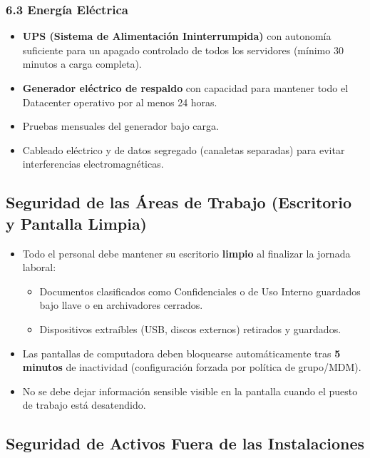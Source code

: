 \documentclass[10pt,letterpaper]{article}
\begin{document}
\subsubsection{6.3 Energía Eléctrica}\label{energuxeda-eluxe9ctrica}

\begin{itemize}
\tightlist
\item
  \textbf{UPS (Sistema de Alimentación Ininterrumpida)} con autonomía
  suficiente para un apagado controlado de todos los servidores (mínimo
  30 minutos a carga completa).
\item
  \textbf{Generador eléctrico de respaldo} con capacidad para mantener
  todo el Datacenter operativo por al menos 24 horas.
\item
  Pruebas mensuales del generador bajo carga.
\item
  Cableado eléctrico y de datos segregado (canaletas separadas) para
  evitar interferencias electromagnéticas.
\end{itemize}

\subsection{Seguridad de las Áreas de Trabajo (Escritorio y Pantalla
Limpia)}\label{seguridad-de-las-uxe1reas-de-trabajo-escritorio-y-pantalla-limpia}

\begin{itemize}
\tightlist
\item
  Todo el personal debe mantener su escritorio \textbf{limpio} al
  finalizar la jornada laboral:

  \begin{itemize}
  \tightlist
  \item
    Documentos clasificados como Confidenciales o de Uso Interno
    guardados bajo llave o en archivadores cerrados.
  \item
    Dispositivos extraíbles (USB, discos externos) retirados y
    guardados.
  \end{itemize}
\item
  Las pantallas de computadora deben bloquearse automáticamente tras
  \textbf{5 minutos} de inactividad (configuración forzada por política
  de grupo/MDM).
\item
  No se debe dejar información sensible visible en la pantalla cuando el
  puesto de trabajo está desatendido.
\end{itemize}

\subsection{Seguridad de Activos Fuera de las
Instalaciones}\label{seguridad-de-activos-fuera-de-las-instalaciones}
\end{document}
